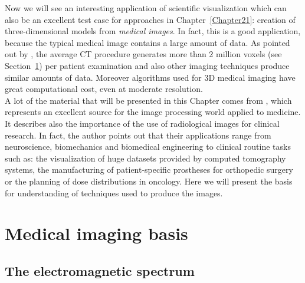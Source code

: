 Now we will see an interesting application of scientific visualization which can also be an excellent test case for approaches in Chapter~\ref{Chapter21}: creation of three-dimensional models from \textit{medical images}.
In fact, this is a good application, because the typical medical image contains a large amount of data. As pointed out by \cite{Stytz}, the average CT procedure generates more than 2 million voxels (see Section~\ref{sec13:medicalImaging}) per patient examination and also other imaging techniques produce similar amounts of data. Moreover algorithms used for 3D medical imaging have great computational cost, even at moderate resolution.\\
\newline
A lot of the material that will be presented in this Chapter comes from \cite{Birkfellner}, which represents an excellent source for the image processing world applied to medicine. It describes also the importance of the use of radiological images for clinical research. In fact, the author points out that their applications range from neuroscience, biomechanics and biomedical engineering to clinical routine tasks such as: the visualization of huge datasets provided by computed tomography systems, the manufacturing of patient-specific prostheses for orthopedic surgery or the planning of dose distributions in oncology. Here we will present the basis for understanding of techniques used to produce the images.

\section{Medical imaging basis}\label{sec13:medicalImaging}

\subsection{The electromagnetic spectrum}

